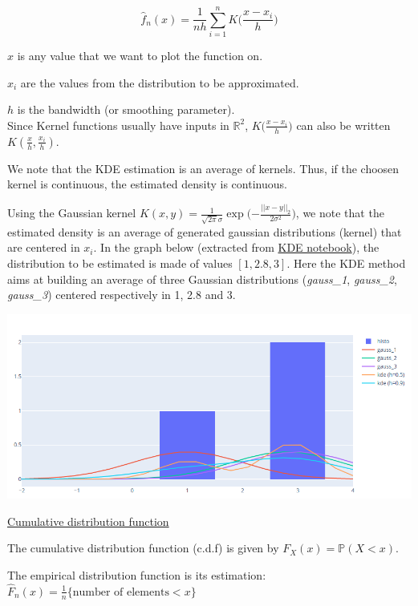 $$\widehat f_n(x) = \frac{1}{nh} \sum_{i=1}^n K \Big( \frac{x-x_i}{h} \Big)$$

$x$ is any value that we want to plot the function on.

$x_i$ are the values from the distribution to be approximated.

$h$ is the bandwidth (or smoothing parameter). \\

Since Kernel functions usually have inputs in $\mathbb{R}^2$, $K \Big( \frac{x-x_i}{h} \Big)$ can also be written $K(\frac{x}{h}, \frac{x_i}{h})$.

We note that the KDE estimation is an average of kernels. Thus, if the choosen kernel is continuous, the estimated density is continuous.

Using the Gaussian kernel $K(x,y) = \frac{1}{\sqrt{2\pi}\sigma} \exp \bigg( {-\frac{||x-y||_2}{2 \sigma^2}} \bigg)$, we note that the estimated density is an average of generated gaussian distributions (kernel) that are centered in $x_i$. In the graph below (extracted from \href{https://github.com/savoga/various_projects/blob/master/Kernel_Density_Estimation.ipynb}{KDE notebook}), the distribution to be estimated is made of values $[1, 2.8, 3]$. Here the KDE method aims at building an average of three Gaussian distributions (\textit{gauss\_1}, \textit{gauss\_2}, \textit{gauss\_3}) centered respectively in 1, 2.8 and 3.

\begin{center}
\includegraphics[scale=0.5]{KDE.png}
\end{center}

\vspace{5mm}

\underline{Cumulative distribution function}

The cumulative distribution function (c.d.f) is given by $F_X(x)= \mathbb{P}(X < x)$. 

The empirical distribution function is its estimation:
$\widehat{F}_n(x) = \frac{1}{n}\{\text{number of elements} < x\}$

